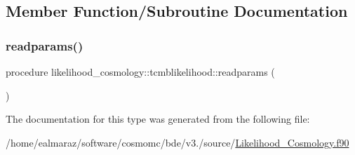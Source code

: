 \subsection{Member Function/\+Subroutine Documentation}
\mbox{\label{structlikelihood__cosmology_1_1tcmblikelihood_a9c51e3006da44a2f83e21e9fdd159fec}} 
\subsubsection{\texorpdfstring{readparams()}{readparams()}}
{\footnotesize\ttfamily procedure likelihood\+\_\+cosmology\+::tcmblikelihood\+::readparams (\begin{DoxyParamCaption}{ }\end{DoxyParamCaption})\hspace{0.3cm}{\ttfamily [private]}}



The documentation for this type was generated from the following file\+:\begin{DoxyCompactItemize}
\item 
/home/ealmaraz/software/cosmomc/bde/v3./source/\mbox{\hyperlink{Likelihood__Cosmology_8f90}{Likelihood\+\_\+\+Cosmology.\+f90}}\end{DoxyCompactItemize}

